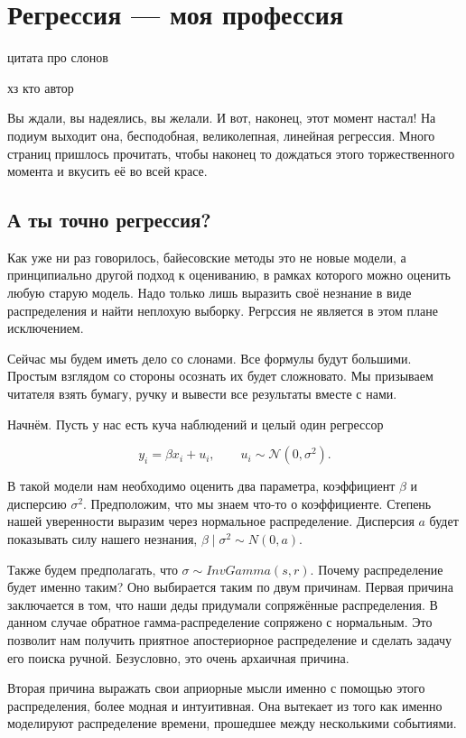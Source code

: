\documentclass[12pt, a4paper, oneside]{extreport}
\def \b{\beta}
\def \mN{\mathcal{N}}
\theoremstyle{plain}              %
\theoremstyle{definition}         %
\begin{document}
	


\chapter{Регрессия --- моя профессия}

\epigraph{цитата про слонов}{хз кто автор}

Вы ждали, вы надеялись, вы желали. И вот, наконец, этот момент настал! На подиум выходит она, бесподобная, великолепная, линейная регрессия. Много страниц пришлось прочитать, чтобы наконец то дождаться этого торжественного момента и вкусить её во всей красе. 

\section{А ты точно регрессия?} 

Как уже ни раз говорилось, байесовские методы это не новые модели, а принципиально другой подход к оцениванию, в рамках которого можно оценить любую старую модель. Надо только лишь выразить своё незнание в виде распределения и найти неплохую выборку. Регрссия не является в этом плане исключением. 

Сейчас мы будем иметь дело со слонами. Все формулы будут большими. Простым взглядом со стороны осознать их будет сложновато. Мы призываем читателя взять бумагу, ручку и вывести все результаты вместе с нами. 

Начнём. Пусть у нас есть куча наблюдений и целый один регрессор

\[ y_i = \b x_i + u_i, \qquad u_i \sim \mN(0, \sigma^2) .\]

В такой модели нам необходимо оценить два параметра, коэффициент $\beta$ и дисперсию $\sigma^2$. Предположим, что мы знаем что-то о коэффициенте. Степень нашей уверенности выразим через нормальное распределение. Дисперсия $a$ будет показывать силу нашего незнания,  $\beta \mid \sigma^2 \sim N(0,a)$.

Также будем предполагать, что $\sigma \sim InvGamma(s,r)$.  Почему распределение будет именно таким? Оно выбирается таким по двум причинам. Первая причина заключается в том, что наши деды придумали сопряжённые распределения. В данном случае обратное гамма-распределение сопряжено с нормальным. Это позволит нам получить приятное апостериорное распределение и сделать задачу его поиска ручной. Безусловно, это очень архаичная причина.

Вторая причина выражать свои априорные мысли именно с помощью этого распределения, более модная и интуитивная. Она вытекает из того как именно моделируют распределение времени, прошедшее между несколькими событиями.
\end{document}
